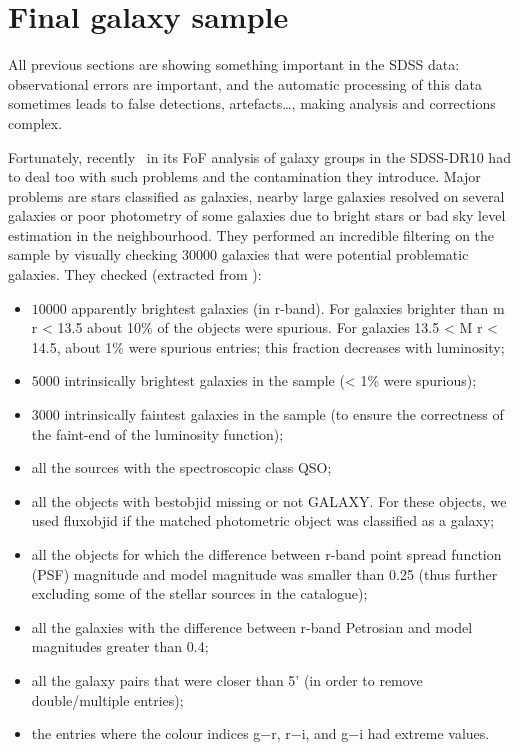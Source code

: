\section{Final galaxy sample}
\label{sec:final_galaxy_sample}

All previous sections are showing something important in the SDSS data:
observational errors are important, and the automatic processing of this data
sometimes leads to false detections, artefacts\ldots, making analysis and
corrections complex.

Fortunately, recently~\cite{Tempel+14} in its FoF analysis of galaxy groups in
the SDSS-DR10 had to deal too with such problems and the contamination they
introduce. Major problems are stars classified as galaxies, nearby large
galaxies resolved on several galaxies or poor photometry of some galaxies due
to bright stars or bad sky level estimation in the neighbourhood. They
performed an incredible filtering on the sample by visually checking 30000
galaxies that were potential problematic galaxies. They checked (extracted from
\cite{Tempel+14}):
%
\begin{itemize}
    \item $10000$ apparently brightest galaxies (in r-band). For galaxies
        brighter than m r < 13.5 about 10\% of the objects were spurious. For
        galaxies 13.5 < M r < 14.5, about 1\% were spurious entries; this
        fraction decreases with luminosity;
    \item $5000$ intrinsically brightest galaxies in the sample (< 1\% were
        spurious);
    \item $3000$ intrinsically faintest galaxies in the sample (to ensure the
        correctness of the faint-end of the luminosity function);
    \item all the sources with the spectroscopic class QSO\@;
    \item all the objects with bestobjid missing or not GALAXY\@. For these
        objects, we used fluxobjid if the matched photometric object was
        classified as a galaxy;
    \item all the objects for which the difference between r-band point spread
        function (PSF) magnitude and model magnitude was smaller than 0.25
        (thus further excluding some of the stellar sources in the catalogue);
    \item all the galaxies with the difference between r-band Petrosian and
        model magnitudes greater than 0.4;
    \item all the galaxy pairs that were closer than 5' (in order to remove
        double/multiple entries);
    \item the entries where the colour indices g−r, r−i, and g−i had extreme
        values.
\end{itemize}

